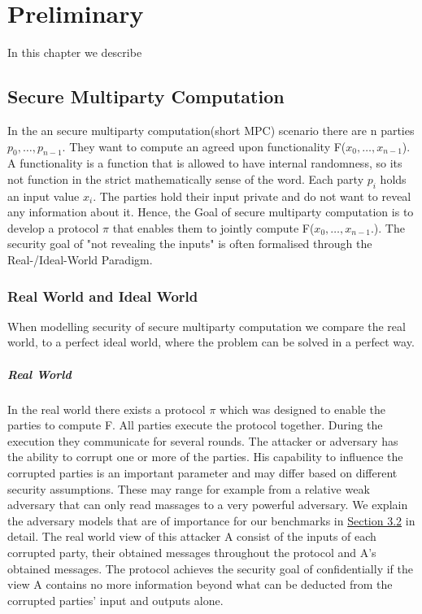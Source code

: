 \chapter{Preliminary}
In this chapter we describe 

\section{Secure Multiparty Computation}
In the an secure multiparty computation(short MPC) scenario there are n parties 
$ p_0,\dots,p_{n-1} $. They want to compute an agreed upon functionality F($ x_0,\dots,x_{n-1} $). A functionality is a function that is allowed to have internal randomness, so its not function in the strict mathematically sense of the word. 
Each party $ p_i $ holds an input value $ x_i $. 
The parties hold their input private and do not want to reveal any information about it. Hence, the Goal of secure multiparty computation is to develop a protocol  $ \pi $ that enables them to jointly compute F($ x_0,\dots,x_{n-1}. $). The security goal of "not revealing the inputs" is often formalised through the Real-/Ideal-World Paradigm. 


\subsection{Real World and Ideal World}
When modelling security of secure multiparty computation we compare the real world, to a perfect ideal world, where the problem can be solved in a perfect way.
\paragraph{Real World}
In the real world there exists a protocol $\pi $ which was designed to enable the parties to compute F. All parties execute the protocol together. During the execution they communicate for several rounds. The attacker or adversary has the ability to corrupt one or more of the parties. His capability to influence the corrupted parties is an important parameter and may differ based on different security assumptions. These may range for example from a relative weak adversary that can only read massages to a very powerful adversary. We explain the adversary models that are of importance for our benchmarks in \hyperref[sec:Adversarial Models]{Section 3.2} in detail.
The real world view of this attacker A consist of the inputs of each corrupted party, their obtained messages throughout the protocol and A's obtained messages. The protocol achieves the security goal of confidentially if the view A contains no more information beyond what can be deducted from the corrupted parties' input and outputs alone. 
